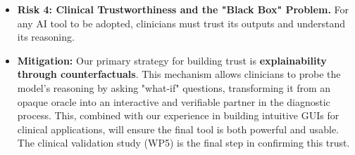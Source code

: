 \documentclass[11pt, a4paper]{article}
\begin{document}
\begin{itemize}
    \item \textbf{Risk 4: Clinical Trustworthiness and the "Black Box" Problem.} For any AI tool to be adopted, clinicians must trust its outputs and understand its reasoning.
    \item \textbf{Mitigation:} Our primary strategy for building trust is \textbf{explainability through counterfactuals}. This mechanism allows clinicians to probe the model's reasoning by asking "what-if" questions, transforming it from an opaque oracle into an interactive and verifiable partner in the diagnostic process. This, combined with our experience in building intuitive GUIs for clinical applications, will ensure the final tool is both powerful and usable. The clinical validation study (WP5) is the final step in confirming this trust.
\end{itemize}




\end{document}
